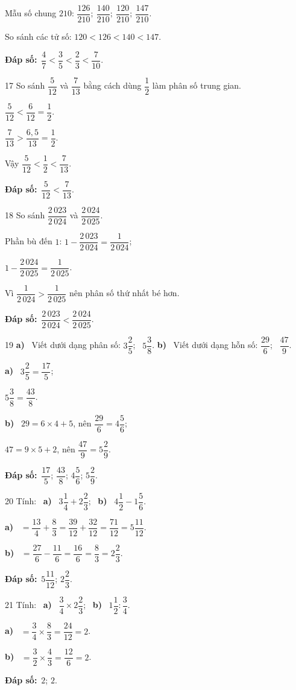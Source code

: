 \documentclass[11pt]{article}
\newif\ifsol \solfalse
\providecommand{\AnsWord}{Đáp số}
\newcommand{\dapso}[1]{\par\textbf{\AnsWord:}\ #1}
\newcommand{\probsol}[1]{%
  \begin{lrbox}{\solmeasure}\begin{minipage}{\dimexpr\linewidth-24pt\relax}#1\end{minipage}\end{lrbox}%
  \ifsol
    \begin{solbox}#1\end{solbox}%
  \else
    \setlength{\solht}{\dimexpr\ht\solmeasure+\dp\solmeasure+0.85cm\relax}%
    \ifdim\solht<1.35cm\setlength{\solht}{1.35cm}\fi
    \begin{tcolorbox}[colback=white,colframe=Line,boxrule=0.8pt,arc=5pt,
      left=8pt,right=8pt,top=4pt,bottom=4pt,height=\solht]{\footnotesize\color{Slate}\itshape\WorkWord}\end{tcolorbox}%
  \fi}
\newcommand{\pa}[1]{\textbf{#1)}\ }
\newcommand{\gap}{\vspace{0.3cm}}
\def\WorkWord{Bài làm:}
\def\AnsWord{Đáp số}
\begin{document}
\probsol{
Mẫu số chung $210$: $\dfrac{126}{210};\ \dfrac{140}{210};\ \dfrac{120}{210};\ \dfrac{147}{210}$.\par So sánh các tử số: $120<126<140<147$.
\dapso{$\dfrac47<\dfrac35<\dfrac23<\dfrac7{10}$.}}
\gap
\begin{probbox}{17}{\relax}
So sánh $\dfrac5{12}$ và $\dfrac7{13}$ bằng cách dùng $\dfrac12$ làm phân số trung gian.
\end{probbox}
\probsol{
$\dfrac5{12}<\dfrac6{12}=\dfrac12$.\par $\dfrac7{13}>\dfrac{6{,}5}{13}=\dfrac12$.\par Vậy $\dfrac5{12}<\dfrac12<\dfrac7{13}$.
\dapso{$\dfrac5{12}<\dfrac7{13}$.}}
\gap
\begin{probbox}{18}{\relax}
So sánh $\dfrac{2\,023}{2\,024}$ và $\dfrac{2\,024}{2\,025}$.
\end{probbox}
\probsol{
Phần bù đến $1$: $1-\dfrac{2\,023}{2\,024}=\dfrac1{2\,024}$;\par $1-\dfrac{2\,024}{2\,025}=\dfrac1{2\,025}$.\par Vì $\dfrac1{2\,024}>\dfrac1{2\,025}$ nên phân số thứ nhất bé hơn.
\dapso{$\dfrac{2\,023}{2\,024}<\dfrac{2\,024}{2\,025}$.}}
\gap
\begin{probbox}{19}{\relax}
\pa{a} Viết dưới dạng phân số: $3\dfrac25$; \ $5\dfrac38$. \quad \pa{b} Viết dưới dạng hỗn số: $\dfrac{29}6$; \ $\dfrac{47}9$.
\end{probbox}
\probsol{
\pa{a} $3\dfrac25=\dfrac{17}5$;\par $5\dfrac38=\dfrac{43}8$.\par \pa{b} $29=6\times4+5$, nên $\dfrac{29}6=4\dfrac56$;\par $47=9\times5+2$, nên $\dfrac{47}9=5\dfrac29$.
\dapso{$\dfrac{17}5$; $\dfrac{43}8$; $4\dfrac56$; $5\dfrac29$.}}
\gap
\begin{probbox}{20}{\relax}
Tính: \ \pa{a} $3\dfrac14+2\dfrac23$; \ \pa{b} $4\dfrac12-1\dfrac56$.
\end{probbox}
\probsol{
\pa{a} $=\dfrac{13}4+\dfrac83=\dfrac{39}{12}+\dfrac{32}{12}=\dfrac{71}{12}=5\dfrac{11}{12}$.\par \pa{b} $=\dfrac{27}6-\dfrac{11}6=\dfrac{16}6=\dfrac83=2\dfrac23$.
\dapso{$5\dfrac{11}{12}$; $2\dfrac23$.}}
\gap
\begin{probbox}{21}{\relax}
Tính: \ \pa{a} $\dfrac34\times2\dfrac23$; \ \pa{b} $1\dfrac12:\dfrac34$.
\end{probbox}
\probsol{
\pa{a} $=\dfrac34\times\dfrac83=\dfrac{24}{12}=2$.\par \pa{b} $=\dfrac32\times\dfrac43=\dfrac{12}6=2$.
\dapso{$2$; $2$.}}
\end{document}
